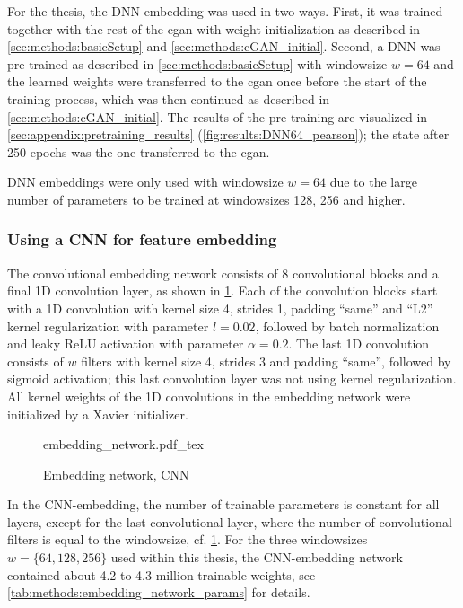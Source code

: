 For the thesis, the DNN-embedding was used in two ways.
First, it was trained together with the rest of the \acrshort{cgan} with weight initialization as described in 
\cref{sec:methods:basicSetup} and \ref{sec:methods:cGAN_initial}.
Second, a DNN was pre-trained as described in \cref{sec:methods:basicSetup} with windowsize $w=64$
and the learned weights were transferred to the \acrshort{cgan} once before the start of the training process,
which was then continued as described in \cref{sec:methods:cGAN_initial}.
The results of the pre-training are visualized in \cref{sec:appendix:pretraining_results} (\cref{fig:results:DNN64_pearson});
the state after 250 epochs was the one transferred to the \acrshort{cgan}.

DNN embeddings were only used with windowsize $w=64$ due to the large number of parameters
to be trained at windowsizes 128, 256 and higher.

\subsubsection{Using a CNN for feature embedding} \label{sec:methods:cnn-embedding}
The convolutional embedding network consists of 8 convolutional blocks and a final 1D convolution layer, 
as shown in \cref{fig:methods:GAN_arch:embedding_network}.
Each of the convolution blocks start with a 1D convolution with kernel size 4, strides 1, padding ``same'' 
and ``L2'' kernel regularization with parameter $l=0.02$, followed by batch normalization and leaky ReLU activation
with parameter $\alpha=0.2$. 
The last 1D convolution consists of $w$ filters with kernel size 4, strides 3 and padding ``same'',
followed by sigmoid activation; this last convolution layer was not using kernel regularization.
All kernel weights of the 1D convolutions in the embedding network were initialized by a Xavier initializer.
\begin{figure}[p]
    \scriptsize
    \centering
    {embedding_network.pdf_tex}
    \caption{Embedding network, CNN} \label{fig:methods:GAN_arch:embedding_network}
\end{figure}

In the CNN-embedding, the number of trainable parameters is constant for all layers, except for the last convolutional layer, where the number
of convolutional filters is equal to the windowsize, cf. \cref{fig:methods:GAN_arch:embedding_network}. 
For the three windowsizes $w=\{64,128,256\}$ used within this thesis, the CNN-embedding network 
contained about 4.2 to 4.3 million trainable weights, see \cref{tab:methods:embedding_network_params} for details.

